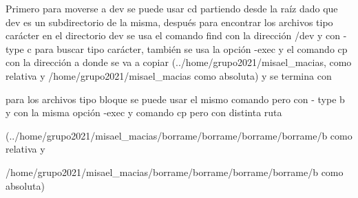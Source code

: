 \documentclass[12pt,a4paper]{article}
\begin{document}
\noindent Primero para moverse a dev se puede usar cd partiendo desde la raíz dado que dev es un subdirectorio de la misma, después para encontrar los archivos tipo carácter en el directorio dev se usa el comando find  con la dirección /dev y con - type c para buscar tipo carácter, también se usa la opción -exec y el comando cp con la dirección a donde se va a copiar (../home/grupo2021/misael\_macias, como relativa y /home/grupo2021/misael\_macias como absoluta) y se termina con {} \;

\noindent para los archivos tipo bloque se puede usar el mismo comando pero con - type b y con la misma opción -exec y comando cp pero con distinta ruta 

\noindent (../home/grupo2021/misael\_macias/borrame/borrame/borrame/borrame/b como relativa y 

/home/grupo2021/misael\_macias/borrame/borrame/borrame/borrame/b como absoluta) 
\end{document}
